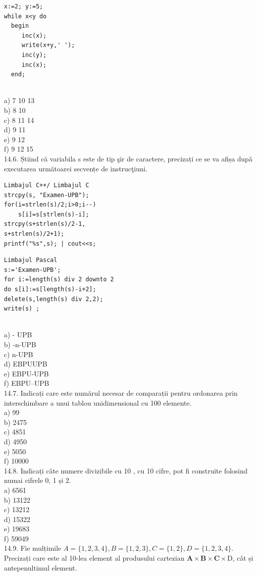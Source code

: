 {{\begin{verbatim}
x:=2; y:=5; 
while x<y do 
  begin 
     inc(x); 
     write(x+y,' '); 
     inc(y); 
     inc(x); 
  end; 
\end{verbatim}
\\
a) 7 10 13
\\
b) 8 10
\\
c) 8 11 14
\\
d) 9 11
\\
e) 9 12
\\
f) 9 12 15
\\
14.6. Știind că variabila s este de tip şir de caractere, precizați ce se va afișa după executarea următoarei secvențe de instrucţiuni.
\begin{verbatim}
Limbajul C++/ Limbajul C
strcpy(s, "Examen-UPB");
for(i=strlen(s)/2;i>0;i--)
    s[i]=s[strlen(s)-i];
strcpy(s+strlen(s)/2-1,
s+strlen(s)/2+1);
printf("%s",s); | cout<<s;
\end{verbatim}
\begin{verbatim}
Limbajul Pascal
s:='Examen-UPB';
for i:=length(s) div 2 downto 2
do s[i]:=s[length(s)-i+2];
delete(s,length(s) div 2,2);
write(s) ;
\end{verbatim}
\\
a) - UPB
\\
b) -n-UPB
\\
c) n-UPB
\\
d) EBPUUPB
\\
e) EBPU-UPB
\\
f) EBPU--UPB
\\
14.7. Indicați care este numărul necesar de comparații pentru ordonarea prin interschimbare a unui tablou unidimensional cu 100 elemente.
\\
a) 99
\\
b) 2475
\\
c) 4851
\\
d) 4950
\\
e) 5050
\\
f) 10000
\\
14.8. Indicați câte numere divizibile cu 10 , cu 10 cifre, pot fi construite folosind numai cifrele 0, 1 și 2.
\\
a) 6561
\\
b) 13122
\\
c) 13212
\\
d) 15322
\\
e) 19683
\\
f) 59049
\\
14.9. Fie mulțimile $A=\{1,2,3,4\}, B=\{1,2,3\}, C=\{1,2\}, D=\{1,2,3,4\}$. Precizați care este al 10-lea element al produsului cartezian $\mathbf{A} \times \mathbf{B} \times \mathbf{C} \times \mathrm{D}$, cât și antepenultimul element.
}}
